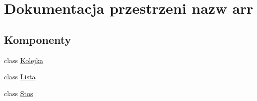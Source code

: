 \hypertarget{namespacearr}{\section{Dokumentacja przestrzeni nazw arr}
\label{namespacearr}
}
\subsection*{Komponenty}
\begin{DoxyCompactItemize}
\item 
class \hyperlink{classarr_1_1_kolejka}{Kolejka}
\item 
class \hyperlink{classarr_1_1_lista}{Lista}
\item 
class \hyperlink{classarr_1_1_stos}{Stos}
\end{DoxyCompactItemize}
